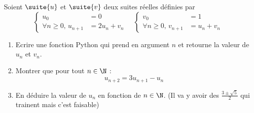 \documentclass[a4paper, 11pt,reqno]{article}
\begin{document}
\begin{exercice}
Soient $\suite{u}$ et $\suite{v}$ deux suites réelles définies par 
$$\left\{ 
\begin{array}{rl}
u_0&=0\\
\forall n\geq 0,\, u_{n+1} &= 2u_n +v_n
\end{array}\right. \quad \left\{ 
\begin{array}{rl}
v_0&=1\\
\forall n\geq 0,\,v_{n+1} &= u_n +v_n
\end{array}\right.$$
\end{exercice}

\begin{enumerate}
\item Ecrire une fonction Python qui prend en argument $n$  et retourne la valeur de $u_n$ et $v_n$. 
\item Montrer que pour tout $n\in \N$ :
$$u_{n+2} = 3u_{n+1} -u_n$$
\item En déduire la valeur de $u_n$ en fonction de $n\in \N$.  (Il va y avoir des $\frac{3\pm \sqrt{5}}{2}$ qui trainent mais c'est faisable)
\end{enumerate}
\end{document}
